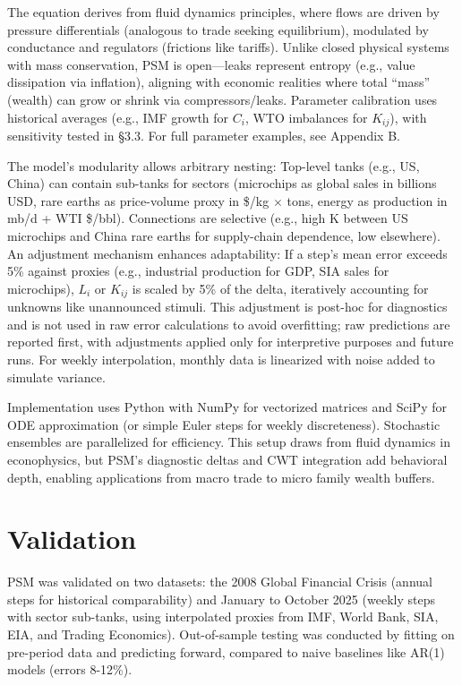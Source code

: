 \documentclass[11pt]{article}
\begin{document}
The equation derives from fluid dynamics principles, where flows are driven by pressure differentials (analogous to trade seeking equilibrium), modulated by conductance and regulators (frictions like tariffs). Unlike closed physical systems with mass conservation, PSM is open---leaks represent entropy (e.g., value dissipation via inflation), aligning with economic realities where total ``mass'' (wealth) can grow or shrink via compressors/leaks. Parameter calibration uses historical averages (e.g., IMF growth for $C_i$, WTO imbalances for $K_{ij}$), with sensitivity tested in \S3.3. For full parameter examples, see Appendix B.

The model's modularity allows arbitrary nesting: Top-level tanks (e.g., US, China) can contain sub-tanks for sectors (microchips as global sales in billions USD, rare earths as price-volume proxy in \$/kg $\times$ tons, energy as production in mb/d + WTI \$/bbl). Connections are selective (e.g., high K between US microchips and China rare earths for supply-chain dependence, low elsewhere). An adjustment mechanism enhances adaptability: If a step's mean error exceeds 5\% against proxies (e.g., industrial production for GDP, SIA sales for microchips), $L_i$ or $K_{ij}$ is scaled by 5\% of the delta, iteratively accounting for unknowns like unannounced stimuli. This adjustment is post-hoc for diagnostics and is not used in raw error calculations to avoid overfitting; raw predictions are reported first, with adjustments applied only for interpretive purposes and future runs. For weekly interpolation, monthly data is linearized with noise added to simulate variance.

Implementation uses Python with NumPy for vectorized matrices and SciPy for ODE approximation (or simple Euler steps for weekly discreteness). Stochastic ensembles are parallelized for efficiency. This setup draws from fluid dynamics in econophysics, but PSM's diagnostic deltas and CWT integration add behavioral depth, enabling applications from macro trade to micro family wealth buffers.

\section{Validation}
PSM was validated on two datasets: the 2008 Global Financial Crisis (annual steps for historical comparability) and January to October 2025 (weekly steps with sector sub-tanks, using interpolated proxies from IMF, World Bank, SIA, EIA, and Trading Economics). Out-of-sample testing was conducted by fitting on pre-period data and predicting forward, compared to naive baselines like AR(1) models (errors 8-12\%).
\end{document}
